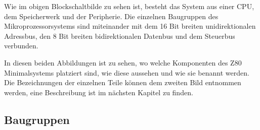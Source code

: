 Wie im obigen Blockschaltbilde zu sehen ist, besteht das System aus einer CPU, dem Speicherwerk und der Peripherie. Die einzelnen Baugruppen des Mikroprozessorsystems sind miteinander mit dem 16 Bit breiten unidirektionalen Adressbus, den 8 Bit breiten bidirektionalen Datenbus und dem Steuerbus verbunden.


In diesen beiden Abbildungen ist zu sehen, wo welche Komponenten des Z80 Minimalsystems platziert sind, wie diese aussehen und wie sie benannt werden. Die Bezeichnungen der einzelnen Teile können dem zweiten Bild entnommen werden, eine Beschreibung ist im nächsten Kapitel zu finden.


\subsection{Baugruppen}
\label{sec:z80-baugruppen}
